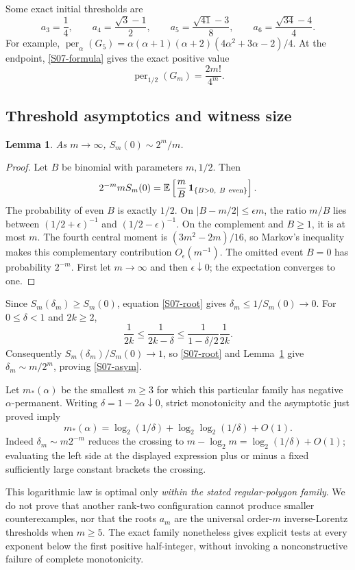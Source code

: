 \documentclass[11pt,a4paper]{article}
\newtheorem{lemma}[theorem]{Lemma}
\theoremstyle{definition}\newtheorem{definition}[theorem]{Definition}
\theoremstyle{remark}\newtheorem{remark}[theorem]{Remark}
\numberwithin{equation}{section}
\begin{document}
Some exact initial thresholds are
\[
 a_3=\frac14,\qquad a_4=\frac{\sqrt3-1}{2},\qquad
 a_5=\frac{\sqrt{41}-3}{8},\qquad a_6=\frac{\sqrt{34}-4}{4}.
\]
For example, $\operatorname{per}_\alpha(G_5)=\alpha(\alpha+1)(\alpha+2)(4\alpha^2+3\alpha-2)/4$. At the endpoint, \eqref{S07-formula} gives the exact positive value
\[
 \operatorname{per}_{1/2}(G_m)=\frac{2m!}{4^m}.
\]

\subsection{Threshold asymptotics and witness size}\label{S07-sec-6}
\begin{lemma}\label{S07-bin}
As $m\to\infty$, $S_m(0)\sim2^m/m$.
\end{lemma}
\begin{proof}
Let $B$ be binomial with parameters $m,1/2$. Then
\[
 2^{-m}mS_m(0)=\mathbb E\left[\frac mB\,
 \mathbf1_{\{B>0,\ B\ {\rm even}\}}\right].
\]
The probability of even $B$ is exactly $1/2$. On $|B-m/2|\le\epsilon m$, the ratio $m/B$ lies between $(1/2+\epsilon)^{-1}$ and $(1/2-\epsilon)^{-1}$. On the complement and $B\ge1$, it is at most $m$. The fourth central moment is $(3m^2-2m)/16$, so Markov's inequality makes this complementary contribution $O_\epsilon(m^{-1})$. The omitted event $B=0$ has probability $2^{-m}$. First let $m\to\infty$ and then $\epsilon\downarrow0$; the expectation converges to one.
\end{proof}
Since $S_m(\delta_m)\ge S_m(0)$, equation \eqref{S07-root} gives $\delta_m\le1/S_m(0)\to0$. For $0\le\delta<1$ and $2k\ge2$,
\[
 \frac1{2k}\le\frac1{2k-\delta}\le\frac1{1-\delta/2}\frac1{2k}.
\]
Consequently $S_m(\delta_m)/S_m(0)\to1$, so \eqref{S07-root} and Lemma~\ref{S07-bin} give $\delta_m\sim m/2^m$, proving \eqref{S07-asym}.

Let $m_*(\alpha)$ be the smallest $m\ge3$ for which this particular family has negative $\alpha$-permanent. Writing $\delta=1-2\alpha\downarrow0$, strict monotonicity and the asymptotic just proved imply
\[
 m_*(\alpha)=\log_2(1/\delta)+\log_2\log_2(1/\delta)+O(1).
\]
Indeed $\delta_m\sim m2^{-m}$ reduces the crossing to $m-\log_2m=\log_2(1/\delta)+O(1)$; evaluating the left side at the displayed expression plus or minus a fixed sufficiently large constant brackets the crossing.

This logarithmic law is optimal only \emph{within the stated regular-polygon family}. We do not prove that another rank-two configuration cannot produce smaller counterexamples, nor that the roots $a_m$ are the universal order-$m$ inverse-Lorentz thresholds when $m\ge5$. The exact family nonetheless gives explicit tests at every exponent below the first positive half-integer, without invoking a nonconstructive failure of complete monotonicity.
\end{document}
